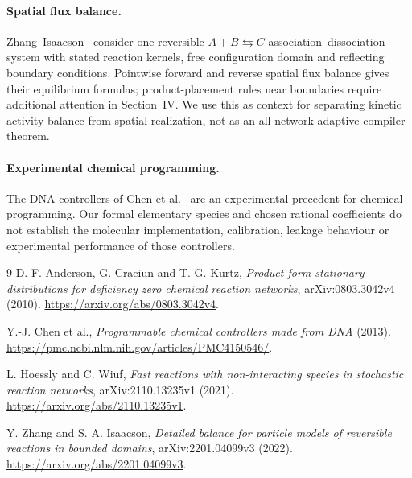 \documentclass[11pt,reqno]{amsart}
\theoremstyle{definition}
\theoremstyle{remark}
\begin{document}
\paragraph{Spatial flux balance.}
Zhang--Isaacson~\cite[Section~III, equation (III.2) and Theorem~III.1]{ZI2022}
consider one reversible $A+B\leftrightarrows C$ association--dissociation
system with stated reaction kernels, free configuration domain and reflecting
boundary conditions. Pointwise forward and reverse spatial flux balance gives
their equilibrium formulas; product-placement rules near boundaries require
additional attention in Section~IV. We use this as context for separating
kinetic activity balance from spatial realization, not as an all-network
adaptive compiler theorem.

\paragraph{Experimental chemical programming.}
The DNA controllers of Chen et al.~\cite{Chen2013} are an experimental
precedent for chemical programming. Our formal elementary species and chosen
rational coefficients do not establish the molecular implementation,
calibration, leakage behaviour or experimental performance of those controllers.

\begin{thebibliography}{9}
D. F. Anderson, G. Craciun and T. G. Kurtz,
\emph{Product-form stationary distributions for deficiency zero chemical
reaction networks}, arXiv:0803.3042v4 (2010).
\url{https://arxiv.org/abs/0803.3042v4}.

Y.-J. Chen et al., \emph{Programmable chemical controllers made from DNA}
(2013). \url{https://pmc.ncbi.nlm.nih.gov/articles/PMC4150546/}.

L. Hoessly and C. Wiuf, \emph{Fast reactions with non-interacting species in
stochastic reaction networks}, arXiv:2110.13235v1 (2021).
\url{https://arxiv.org/abs/2110.13235v1}.

Y. Zhang and S. A. Isaacson, \emph{Detailed balance for particle models of
reversible reactions in bounded domains}, arXiv:2201.04099v3 (2022).
\url{https://arxiv.org/abs/2201.04099v3}.
\end{thebibliography}
\end{document}
